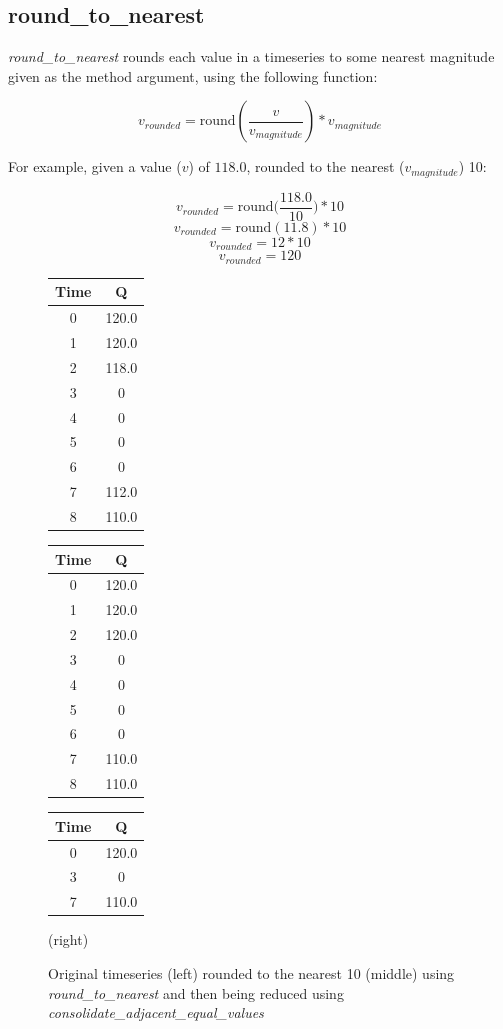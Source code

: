 \documentclass{book}
\begin{document}
\subsection{round\_to\_nearest}
\emph{round\_to\_nearest} rounds each value in a timeseries to some nearest
magnitude given as the method argument, using the following function:

$$v_{rounded} = \textrm{round}(\frac{v}{v_{magnitude}})*v_{magnitude}$$

For example, given a value ($v$) of $118.0$, rounded to the nearest 
($v_{magnitude}$) 10:

$$v_{rounded} = \textrm{round}\Big(\frac{118.0}{10}\Big)*10$$
$$v_{rounded} = \textrm{round}(11.8)*10$$
$$v_{rounded} = 12*10$$
$$v_{rounded} = 120$$

\begin{figure}[H]
\begin{tabular}{c c}
    \hline
    Time & Q \\ \hline
    0 & 120.0 \\
    1 & 120.0 \\
    2 & 118.0 \\
    3 & 0 \\
    4 & 0 \\
    5 & 0 \\
    6 & 0 \\
    7 & 112.0 \\
    8 & 110.0
\end{tabular}
\hspace{2cm} 
\begin{tabular}{c c}
    \hline
    Time & Q \\ \hline
    0 & 120.0 \\
    1 & 120.0 \\
    2 & 120.0 \\
    3 & 0 \\
    4 & 0 \\
    5 & 0 \\
    6 & 0 \\
    7 & 110.0 \\
    8 & 110.0
\end{tabular}
\hspace{2cm} 
\begin{tabular}{c c}
    \hline
    Time & Q \\ \hline
    0 & 120.0 \\
    3 & 0 \\
    7 & 110.0
\end{tabular}
\caption{Original timeseries (left) rounded to the nearest 10
(middle) using \emph{round\_to\_nearest} and then being
reduced using \emph{consolidate\_adjacent\_equal\_values}} (right)
\label{fig:roundedandreduced}
\end{figure}
\end{document}
